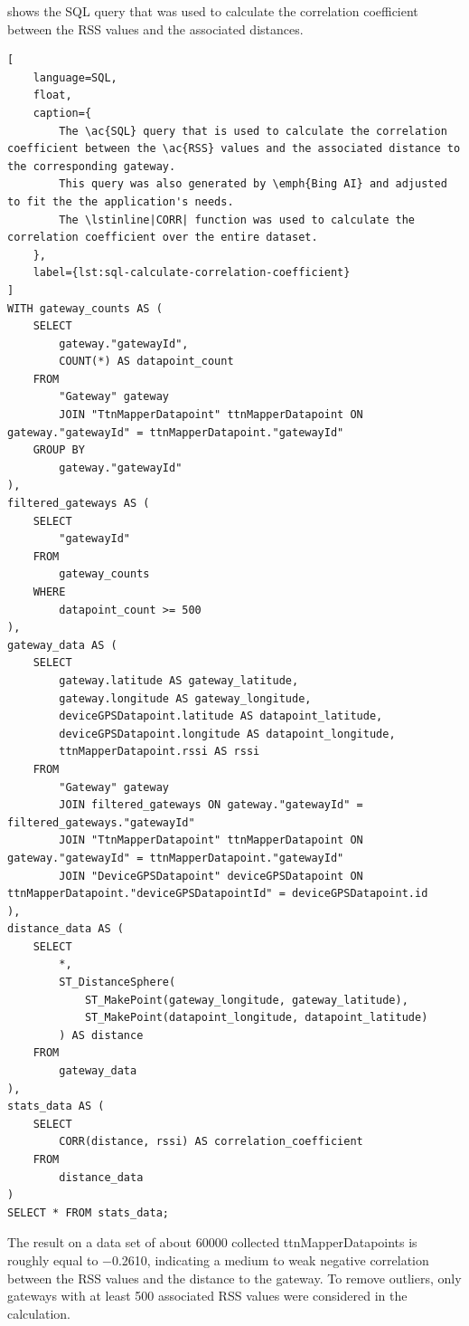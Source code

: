  shows the \ac{SQL} query that was used to calculate the correlation coefficient between the \ac{RSS} values and the associated distances.

\begin{lstlisting}[
    language=SQL,
    float,
    caption={
        The \ac{SQL} query that is used to calculate the correlation coefficient between the \ac{RSS} values and the associated distance to the corresponding gateway.
        This query was also generated by \emph{Bing AI} and adjusted to fit the the application's needs.
        The \lstinline|CORR| function was used to calculate the correlation coefficient over the entire dataset.
    },
    label={lst:sql-calculate-correlation-coefficient}
]
WITH gateway_counts AS (
    SELECT
        gateway."gatewayId",
        COUNT(*) AS datapoint_count
    FROM
        "Gateway" gateway
        JOIN "TtnMapperDatapoint" ttnMapperDatapoint ON gateway."gatewayId" = ttnMapperDatapoint."gatewayId"
    GROUP BY
        gateway."gatewayId"
),
filtered_gateways AS (
    SELECT
        "gatewayId"
    FROM
        gateway_counts
    WHERE
        datapoint_count >= 500
),
gateway_data AS (
    SELECT
        gateway.latitude AS gateway_latitude,
        gateway.longitude AS gateway_longitude,
        deviceGPSDatapoint.latitude AS datapoint_latitude,
        deviceGPSDatapoint.longitude AS datapoint_longitude,
        ttnMapperDatapoint.rssi AS rssi
    FROM
        "Gateway" gateway
        JOIN filtered_gateways ON gateway."gatewayId" = filtered_gateways."gatewayId"
        JOIN "TtnMapperDatapoint" ttnMapperDatapoint ON gateway."gatewayId" = ttnMapperDatapoint."gatewayId"
        JOIN "DeviceGPSDatapoint" deviceGPSDatapoint ON ttnMapperDatapoint."deviceGPSDatapointId" = deviceGPSDatapoint.id
),
distance_data AS (
    SELECT
        *,
        ST_DistanceSphere(
            ST_MakePoint(gateway_longitude, gateway_latitude),
            ST_MakePoint(datapoint_longitude, datapoint_latitude)
        ) AS distance
    FROM
        gateway_data
),
stats_data AS (
    SELECT
        CORR(distance, rssi) AS correlation_coefficient
    FROM
        distance_data
)
SELECT * FROM stats_data;

\end{lstlisting}

The result on a data set of about \num{60000} collected ttnMapperDatapoints is roughly equal to \num{-0.2610}, indicating a medium to weak negative correlation between the \ac{RSS} values and the distance to the gateway.
To remove outliers, only gateways with at least \num{500} associated \ac{RSS} values were considered in the calculation.

